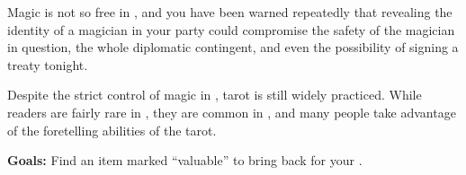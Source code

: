 \documentclass[blue]{NeptuneBall}
\begin{document}
\begin{itemize}
  Magic is not so free in \pAtlantis{}, and you have been warned repeatedly that revealing the identity of a magician in your party could compromise the safety of the magician in question, the whole diplomatic contingent, and even the possibility of signing a treaty tonight.
  
  Despite the strict control of magic in \pAtlantis{}, tarot is still widely practiced. While readers are fairly rare in \pPacifica{}, they are common in \pAtlantis{}, and many people take advantage of the foretelling abilities of the tarot.
\end{itemize}

{\bf Goals:} Find an item marked "`valuable"' to bring back for your \cPacificanRuler{\King}.
\end{document}
